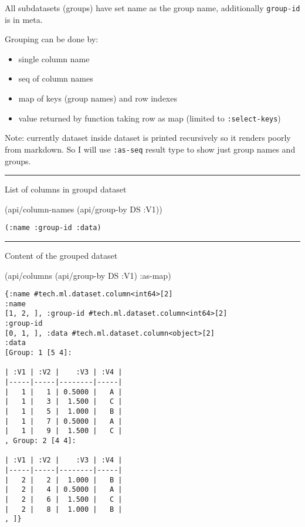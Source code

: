 \documentclass[]{article}
\newenvironment{Shaded}{\begin{snugshade}}{\end{snugshade}}
\newcommand{\AttributeTok}[1]{\textcolor[rgb]{0.77,0.63,0.00}{#1}}
\newcommand{\NormalTok}[1]{#1}
\providecommand{\tightlist}{%
  \setlength{\itemsep}{0pt}\setlength{\parskip}{0pt}}
\begin{document}
All subdatasets (groups) have set name as the group name, additionally
\texttt{group-id} is in meta.

Grouping can be done by:

\begin{itemize}
\tightlist
\item
  single column name
\item
  seq of column names
\item
  map of keys (group names) and row indexes
\item
  value returned by function taking row as map (limited to
  \texttt{:select-keys})
\end{itemize}

Note: currently dataset inside dataset is printed recursively so it
renders poorly from markdown. So I will use \texttt{:as-seq} result type
to show just group names and groups.

\begin{center}\rule{0.5\linewidth}{0.5pt}\end{center}

List of columns in groupd dataset

\begin{Shaded}
\begin{Highlighting}[]
\NormalTok{(api/column-names (api/group-by DS }\AttributeTok{:V1}\NormalTok{))}
\end{Highlighting}
\end{Shaded}

\begin{verbatim}
(:name :group-id :data)
\end{verbatim}

\begin{center}\rule{0.5\linewidth}{0.5pt}\end{center}

Content of the grouped dataset

\begin{Shaded}
\begin{Highlighting}[]
\NormalTok{(api/columns (api/group-by DS }\AttributeTok{:V1}\NormalTok{) }\AttributeTok{:as-map}\NormalTok{)}
\end{Highlighting}
\end{Shaded}

\begin{verbatim}
{:name #tech.ml.dataset.column<int64>[2]
:name
[1, 2, ], :group-id #tech.ml.dataset.column<int64>[2]
:group-id
[0, 1, ], :data #tech.ml.dataset.column<object>[2]
:data
[Group: 1 [5 4]:

| :V1 | :V2 |    :V3 | :V4 |
|-----|-----|--------|-----|
|   1 |   1 | 0.5000 |   A |
|   1 |   3 |  1.500 |   C |
|   1 |   5 |  1.000 |   B |
|   1 |   7 | 0.5000 |   A |
|   1 |   9 |  1.500 |   C |
, Group: 2 [4 4]:

| :V1 | :V2 |    :V3 | :V4 |
|-----|-----|--------|-----|
|   2 |   2 |  1.000 |   B |
|   2 |   4 | 0.5000 |   A |
|   2 |   6 |  1.500 |   C |
|   2 |   8 |  1.000 |   B |
, ]}
\end{verbatim}
\end{document}
